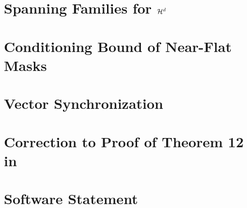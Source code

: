 \chapter{Spanning Families for $\mathcal{H}^d$}
\label{app:gam_span_herm}

\chapter{Conditioning Bound of Near-Flat Masks}
\label{app:nearflat_more}

\chapter{Vector Synchronization}
\label{app:vec_sync}

\chapter{Correction to Proof of Theorem 12 in \cite{bandeira2016se_sync}}
\label{app:bandeira_thing}

\chapter{Software Statement}
\label{app:software}


